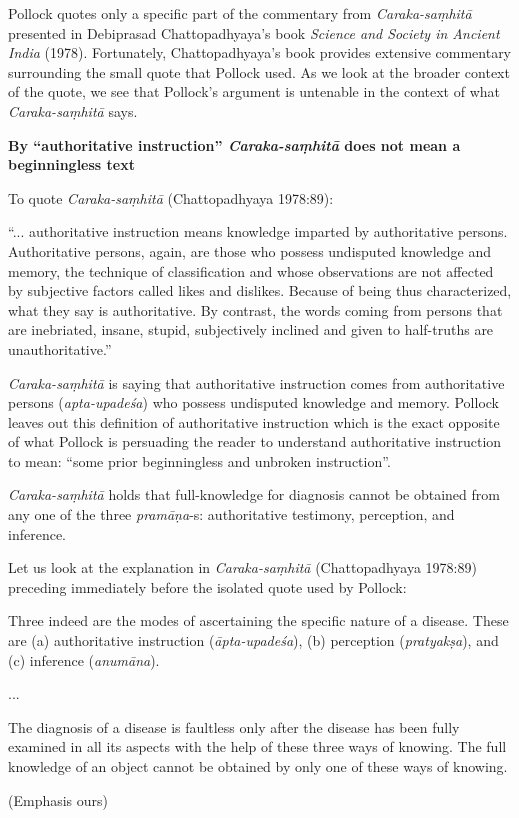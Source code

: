 \newpage

Pollock quotes only a specific part of the commentary from {\sl Caraka-saṃhitā} presented in Debiprasad Chattopadhyaya's book {\sl Science and Society in Ancient India} (1978).  Fortunately, Chattopadhyaya's book provides extensive commentary surrounding the small quote that Pollock used. As we look at the broader context of the quote, we see that Pollock's argument is untenable in the context of what {\sl Caraka-saṃhitā} says.

{\bf By ``authoritative instruction'' {{\sl\bfseries Caraka-saṃhitā}\relax} does not mean a beginningless text}

To quote {\sl Caraka-saṃhitā} (Chattopadhyaya 1978:89):
\begin{myquote}
``... authoritative instruction means knowledge imparted by authoritative persons. Authoritative persons, again, are those who possess undisputed knowledge and memory, the technique of classification and whose observations are not affected by subjective factors called likes and dislikes. Because of being thus characterized, what they say is authoritative.  By contrast, the words coming from persons that are inebriated, insane, stupid, subjectively inclined and given to half-truths are unauthoritative.''
\end{myquote}

{\sl Caraka-saṃhitā} is saying that authoritative instruction comes from authoritative persons ({\sl apta-upadeśa}) who possess undisputed knowledge and memory. Pollock leaves out this definition of authoritative instruction which is the exact opposite of what Pollock is persuading the reader to understand authoritative instruction to mean: ``some prior beginningless and unbroken instruction''.

{\sl Caraka-saṃhitā} holds that full-knowledge for diagnosis cannot be obtained from any one of the three {\sl pramāṇa}-s: authoritative testimony, perception, and inference.

Let us look at the explanation in {\sl Caraka-saṃhitā} (Chattopadhyaya 1978:89) preceding immediately before the isolated quote used by Pollock:
\begin{myquote}
Three indeed are the modes of ascertaining the specific nature of a disease. These are (a) authoritative instruction ({\sl āpta-upadeśa}), (b) perception ({\sl pratyakṣa}), and (c) inference ({\sl anumāna}).

...

The diagnosis of a disease is faultless only after the disease has been fully examined in all its aspects with the help of these three ways of knowing. The full knowledge of an object cannot be obtained by only one of these ways of knowing.

\hfill (Emphasis ours)
\end{myquote}

